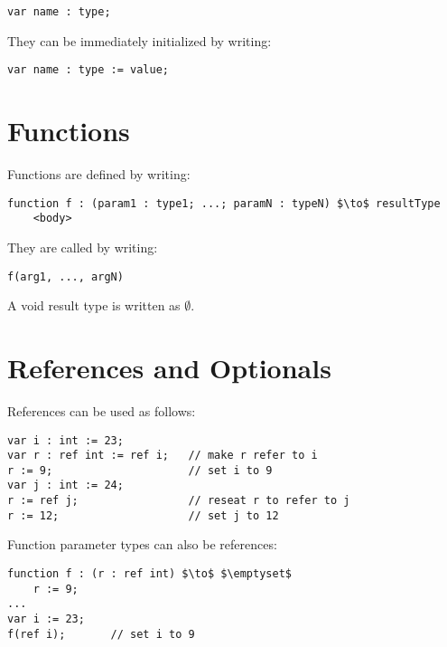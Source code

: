 \begin{lstlisting}[style=Snippet]
var name : type;
\end{lstlisting}
%
They can be immediately initialized by writing:

\begin{lstlisting}[style=Snippet]
var name : type := value;
\end{lstlisting}

\section{Functions}

Functions are defined by writing:

\begin{lstlisting}[style=Snippet]
function f : (param1 : type1; ...; paramN : typeN) $\to$ resultType
	<body>
\end{lstlisting}

\noindent They are called by writing:

\begin{lstlisting}[style=Snippet]
f(arg1, ..., argN)
\end{lstlisting}

\noindent A void result type is written as $\emptyset$.

\section{References and Optionals}

References can be used as follows:

\begin{lstlisting}[style=Snippet]
var i : int := 23;
var r : ref int := ref i;	// make r refer to i
r := 9;						// set i to 9
var j : int := 24;
r := ref j;					// reseat r to refer to j
r := 12;					// set j to 12
\end{lstlisting}

\noindent Function parameter types can also be references:

\begin{lstlisting}[style=Snippet]
function f : (r : ref int) $\to$ $\emptyset$
	r := 9;
...
var i := 23;
f(ref i);		// set i to 9
\end{lstlisting}

